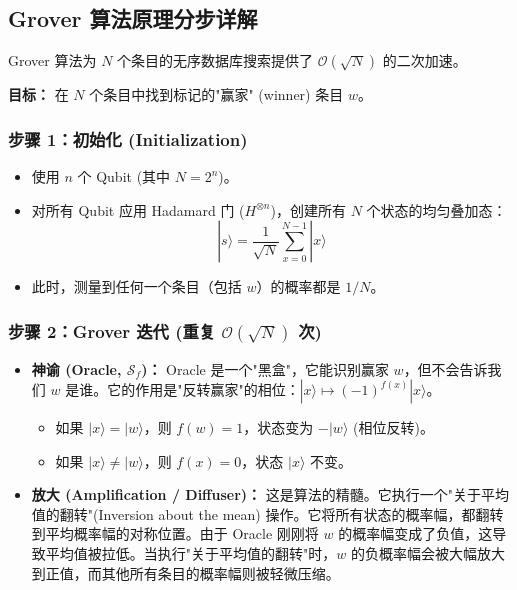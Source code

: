 \documentclass[11pt,a4paper]{article}
\begin{document}
\subsection{Grover 算法原理分步详解}

Grover 算法为 $N$ 个条目的无序数据库搜索提供了 $\mathcal{O}(\sqrt{N})$ 的二次加速。

\textbf{目标：} 在 $N$ 个条目中找到标记的"赢家" (winner) 条目 $w$。

\subsubsection{步骤 1：初始化 (Initialization)}

\begin{itemize}
\item 使用 $n$ 个 Qubit (其中 $N=2^n$)。
\item 对所有 Qubit 应用 Hadamard 门 ($H^{\otimes n}$)，创建所有 $N$ 个状态的均匀叠加态：
\[|s\rangle = \frac{1}{\sqrt{N}}\sum_{x=0}^{N-1}|x\rangle\]
\item 此时，测量到任何一个条目（包括 $w$）的概率都是 $1/N$。
\end{itemize}

\subsubsection{步骤 2：Grover 迭代 (重复 \texorpdfstring{$\mathcal{O}(\sqrt{N})$}{O(sqrt N)} 次)}

\begin{itemize}
\item \textbf{神谕 (Oracle, $\mathcal{S}_f$)：}
Oracle 是一个"黑盒"，它能识别赢家 $w$，但不会告诉我们 $w$ 是谁。它的作用是"反转赢家"的相位：$|x\rangle \mapsto (-1)^{f(x)}|x\rangle$。
\begin{itemize}
\item 如果 $|x\rangle = |w\rangle$，则 $f(w)=1$，状态变为 $-|w\rangle$ (相位反转)。
\item 如果 $|x\rangle \neq |w\rangle$，则 $f(x)=0$，状态 $|x\rangle$ 不变。
\end{itemize}

\item \textbf{放大 (Amplification / Diffuser)：}
这是算法的精髓。它执行一个"关于平均值的翻转"(Inversion about the mean) 操作。它将所有状态的概率幅，都翻转到平均概率幅的对称位置。由于 Oracle 刚刚将 $w$ 的概率幅变成了负值，这导致平均值被拉低。当执行"关于平均值的翻转"时，$w$ 的负概率幅会被大幅放大到正值，而其他所有条目的概率幅则被轻微压缩。
\end{itemize}
\end{document}
